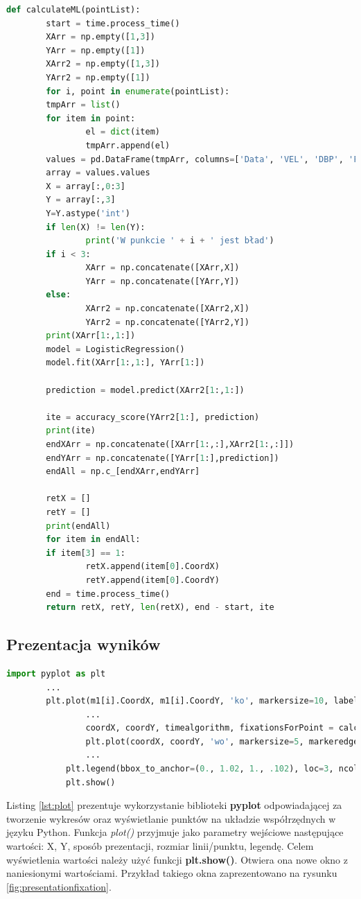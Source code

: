\begin{lstlisting}[language=Python, caption=Algorytm wykorzystujący uczenie maszynowe, label={lst:mlalgorithm}]
def calculateML(pointList):
        start = time.process_time()
        XArr = np.empty([1,3])
        YArr = np.empty([1])
        XArr2 = np.empty([1,3])
        YArr2 = np.empty([1])
        for i, point in enumerate(pointList):
        tmpArr = list()
        for item in point:
                el = dict(item)
                tmpArr.append(el)
        values = pd.DataFrame(tmpArr, columns=['Data', 'VEL', 'DBP', 'FIX'])
        array = values.values
        X = array[:,0:3]
        Y = array[:,3]
        Y=Y.astype('int')
        if len(X) != len(Y):
                print('W punkcie ' + i + ' jest bład')
        if i < 3:
                XArr = np.concatenate([XArr,X])
                YArr = np.concatenate([YArr,Y])
        else:
                XArr2 = np.concatenate([XArr2,X])
                YArr2 = np.concatenate([YArr2,Y])
        print(XArr[1:,1:])
        model = LogisticRegression()
        model.fit(XArr[1:,1:], YArr[1:])

        prediction = model.predict(XArr2[1:,1:])

        ite = accuracy_score(YArr2[1:], prediction)
        print(ite)
        endXArr = np.concatenate([XArr[1:,:],XArr2[1:,:]])
        endYArr = np.concatenate([YArr[1:],prediction])
        endAll = np.c_[endXArr,endYArr]

        retX = []
        retY = []
        print(endAll)
        for item in endAll:
        if item[3] == 1:
                retX.append(item[0].CoordX)
                retY.append(item[0].CoordY)
        end = time.process_time()
        return retX, retY, len(retX), end - start, ite
\end{lstlisting}

\subsection{Prezentacja wyników}
\label{ssec:datashow}
\begin{lstlisting}[language=Python, caption=Wyświetlanie wyników, label={lst:plot}]
        import pyplot as plt
        ...
        plt.plot(m1[i].CoordX, m1[i].CoordY, 'ko', markersize=10, label='Eye-tracker points' if i == 0 else "")
                ...
                coordX, coordY, timealgorithm, fixationsForPoint = calculateIdtAlgorithm(m1)
                plt.plot(coordX, coordY, 'wo', markersize=5, markeredgecolor='r', label='Calculated fixations')
                ...
            plt.legend(bbox_to_anchor=(0., 1.02, 1., .102), loc=3, ncol=2, mode="expand", borderaxespad=0.)
            plt.show()
\end{lstlisting}
Listing \ref{lst:plot} prezentuje wykorzystanie biblioteki \textbf{pyplot} odpowiadającej za tworzenie wykresów oraz wyświetlanie punktów na układzie współrzędnych w języku Python. Funkcja \emph{plot()} przyjmuje jako parametry wejściowe następujące wartości: X, Y, sposób prezentacji, rozmiar linii/punktu, legendę. Celem wyświetlenia wartości należy użyć funkcji \textbf{plt.show()}. Otwiera ona nowe okno z naniesionymi wartościami. Przykład takiego okna zaprezentowano na rysunku \ref{fig:presentationfixation}.
